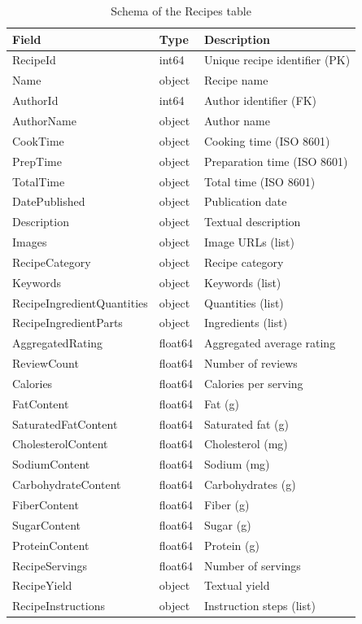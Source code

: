 \documentclass[11pt,a4paper]{article}
\begin{document}
\begin{table}[H]
\centering
\small
\begin{tabular}{llp{6cm}}
\toprule
\textbf{Field} & \textbf{Type} & \textbf{Description} \\
\midrule
RecipeId & int64 & Unique recipe identifier (PK) \\
Name & object & Recipe name \\
AuthorId & int64 & Author identifier (FK) \\
AuthorName & object & Author name \\
CookTime & object & Cooking time (ISO 8601) \\
PrepTime & object & Preparation time (ISO 8601) \\
TotalTime & object & Total time (ISO 8601) \\
DatePublished & object & Publication date \\
Description & object & Textual description \\
Images & object & Image URLs (list) \\
RecipeCategory & object & Recipe category \\
Keywords & object & Keywords (list) \\
RecipeIngredientQuantities & object & Quantities (list) \\
RecipeIngredientParts & object & Ingredients (list) \\
AggregatedRating & float64 & Aggregated average rating \\
ReviewCount & float64 & Number of reviews \\
Calories & float64 & Calories per serving \\
FatContent & float64 & Fat (g) \\
SaturatedFatContent & float64 & Saturated fat (g) \\
CholesterolContent & float64 & Cholesterol (mg) \\
SodiumContent & float64 & Sodium (mg) \\
CarbohydrateContent & float64 & Carbohydrates (g) \\
FiberContent & float64 & Fiber (g) \\
SugarContent & float64 & Sugar (g) \\
ProteinContent & float64 & Protein (g) \\
RecipeServings & float64 & Number of servings \\
RecipeYield & object & Textual yield \\
RecipeInstructions & object & Instruction steps (list) \\
\bottomrule
\end{tabular}
\caption{Schema of the Recipes table}
\label{tab:schema_recipes}
\end{table}
\end{document}

